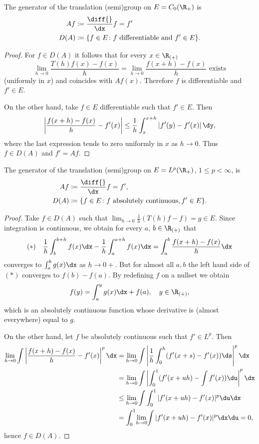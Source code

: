 The generator of the translation (semi)group on $E = C_{0}(\R_{+})$ is 
\begin{align*}
    Af & \coloneqq \frac{\diff{}}{\dx}f = f' \\
    D(A) &\coloneqq \{f \in E \colon f \text{ differentiable and } f' \in E\}.
\end{align*}
\begin{proof}
For $f \in D(A)$ it follows that for every $x \in \R_{(+)}$
\[
    \lim_{h \to 0} \frac{T(h)f(x) - f(x)}{h} = \lim_{h \to 0} \frac{f(x+h) - f(x)}{h} \text{ exists}
\]
(uniformly in $x$) and coincides with $Af(x)$.
Therefore $f$ is differentiable and $f' \in E$.

On the other hand, take $f \in E$ differentiable such that $f' \in E$.
Then
\[
    \left|\frac{f(x+h) - f(x)}{h} - f'(x)\right| \leq \frac{1}{h}\int_{x}^{x+h}|f'(y) - f'(x)|\,\dy,
\]
where the last expression tends to zero uniformly in $x$ as $h \to 0$.
Thus $f \in D(A)$ and $f' = Af$.
\end{proof}
The generator of the translation (semi)group on $E = L^{p}(\R_{+})$, $1 \leq p < \infty$, is
\begin{align*}
    Af &\coloneqq \frac{\diff{}}{\dx}f = f', \\
    D(A) &\coloneqq \{f \in E \colon f \text{ absolutely continuous}, f' \in E\}.
\end{align*}
\begin{proof}
Take $f \in D(A)$ such that $\lim_{h \to 0} \frac{1}{h}(T(h)f - f) = g \in E$.
Since integration is continuous, we obtain for every $a$, $b \in \R_{(+)}$ that
\begin{equation*}\label{eq:a1-2.1}
(*) \quad \frac{1}{h}\int_{b}^{b+h} f(x) \dx - \frac{1}{h}\int_{a}^{a+h} f(x) \dx = \int_{a}^{b} \frac{f(x+h) - f(x)}{h} \dx
\end{equation*}
converges to $\int_{a}^{b} g(x) \dx$ as $h \to 0+$.
But for almost all $a, b$ the left hand side of\/ $(*)$ converges to $f(b) - f(a)$.
By redefining $f$ on a nullset we obtain
\[
    f(y) = \int_{a}^{y} g(x)\dx + f(a), \quad y \in \R_{(+)},
\]
which is an absolutely continuous function whose derivative is (almost everywhere) equal to $g$.

On the other hand, let $f$ be absolutely continuous such that $f' \in L^{p}$.
Then
\begin{align*}
    \lim_{h \to 0} \int{\left|\frac{f(x+h) - f(x)}{h} - f'(x)\right|^{p} \dx} 
    &= \lim_{h \to 0} \int {\left|\frac{1}{h}\int_{0}^{h} (f'(x+s) - f'(x)) \ds\right|^{p} \dx }\\
    &= \lim_{h \to 0} \int {\left|\int_{0}^{1} (f'(x+uh) -  \int f'(x)) \du\right|^{p} \dx }\\
    &\leq \lim_{h \to 0}{ \int \int_{0}^{1} |f'(x+uh) - f'(x)|^p \du \dx }\\
    & = {\int_{0}^{1}} \displaystyle{\lim_{h \to 0}} {\int|f'(x+uh) - f'(x)|^{p} \dx \du = 0},
\end{align*}
hence $f \in D(A)$.
\end{proof}
